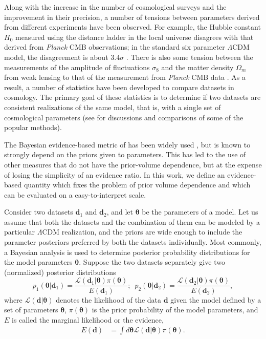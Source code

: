 \documentclass[amsmath, amssymb, reprint, aps]{revtex4-1}
\newcommand{\dv}{\textbf{d}}
\newcommand{\tv}{\bm{\theta}}
\begin{document}
    Along with the increase in the number of cosmological surveys and the improvement in their precision, a number of tensions between  parameters derived from different experiments have been observed. For example, the Hubble constant $H_0$ measured using the distance ladder in the local universe disagrees with that derived from {\it Planck} CMB observations; in the standard six parameter $\Lambda$CDM model, the disagreement is about $3.4\sigma$ \cite{Riess:2016jrr, Bernal:2016gxb}. There is also some tension between the measurements of the amplitude of fluctuations $\sigma_8$ and the matter density $\Omega_m$ from weak lensing to that of the measurement from {\it Planck} CMB data \citep{Hildebrandt:2016iqg,Troxel:2017xyo,Troxel:2018qll}. As a result, a number of statistics have been developed to compare datasets in cosmology. The primary goal of these statistics is to determine if two datasets are consistent realizations of the same model, that is, with a single set of cosmological parameters (see \cite{Seehars:2015qza, Charnock:2017vcd, Lin:2017ikq} for discussions and comparisons of some of the popular methods). 
    
    The Bayesian evidence-based metric of \cite{Marshall:2004zd} has been widely used \cite{March:2011rv, Amendola:2012wc, Joudaki:2016mvz, Raveri:2015maa}, but is known to strongly depend on the priors given to parameters. This has led to the use of other measures \cite{Seehars:2014ora,Grandis:2016fwl, Feeney:2018mkj} that do not have the prior-volume dependence, but at the expense of losing the simplicity of an evidence ratio. 
    In this work, we define an evidence-based quantity which fixes the problem of prior volume dependence and which can be evaluated on a easy-to-interpret scale.
    
    Consider two datasets $\dv_1$ and $\dv_2$, and let $\tv$ be the  parameters of a model. Let us assume that both the datasets and the combination of them can be modeled by a particular $\Lambda$CDM realization, and the priors are wide enough to include the parameter posteriors preferred by both the datasets individually. Most commonly, a Bayesian analysis is used to determine posterior probability distributions for the model parameters $\tv$. Suppose the two datasets separately give two (normalized) posterior distributions
    \begin{equation}
    \!\!\!
    p_1(\tv | \dv_1) = \frac{ \mathcal{L}(\dv_1|\tv) \pi(\tv)}{E(\dv_1)}; \,\,\,
    p_2(\tv | \dv_2) = \frac{\mathcal{L}(\dv_2|\tv) \pi(\tv)}{E(\dv_2)}, 
    \label{eq:p1p2}
    \end{equation}
    where $\mathcal{L}(\dv|\tv)$ denotes the likelihood of the data $\dv$ given the model defined by a set of parameters $\tv$, $\pi(\tv)$ is the prior probability of the model parameters, and $E$ is called the marginal likelihood or the evidence,
    \begin{align}
        E(\dv) &= \int d\tv \mathcal{L}(\dv|\tv) \pi(\tv).
        \label{eq:evidence}
    \end{align}
    
\end{document}
